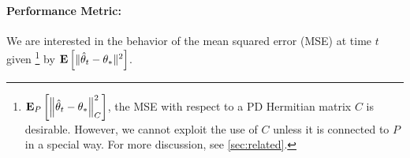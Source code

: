 \paragraph{Performance Metric:}  
We are interested in the behavior of the mean squared error (MSE) at time $t$ given%
\footnote{ $\mathbf{E}_P\left[\left\| \hat{\theta}_t-\theta_*\right\|_C^2\right]$, the MSE with respect to a PD Hermitian matrix $C$ is desirable.
However, we cannot exploit the use of $C$ unless it is connected to $P$ in a special way. 
For more discussion, see \cref{sec:related}.}
 by $\mathbf{E}\left[\| \hat{\theta}_t-\theta_*\|^2\right]$. 
\begin{comment}
\footnote{We note here that $\EE{P\norm{\thh_t-\ts}_C^2}$ which measures the MSE in the quadratic norm with respect to a positive definite matrix $C\succ 0$. However, unless $C$ has some special structure, it is not possible to exploit this generality in our bounds. Further, when data is bounded $\norm{C}^2$ is also bounded and it is straightforward to see that $\EEP{\norm{\thh_t-\ts}}^2_C\leq \norm{C}^2\EEP{\norm{\thh_t-\ts}^2}$. So, for the purpose of stating our results we will not use the general quadratic norm, however, will use it when we discuss the work by \cite{bach} in the linear regression setting, where its usage is relevant.}
\end{comment}
{}
